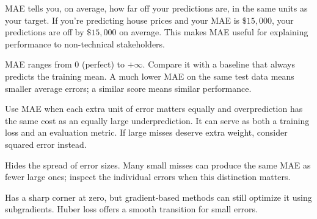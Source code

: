 \clearpage
\thispagestyle{regressionstyle}
\label{sec:mae}

MAE tells you, on average, how far off your predictions are, in the same units as your target. If you're predicting house prices and your MAE is $\$15{,}000$, your predictions are off by $\$15{,}000$ on average. This makes MAE useful for explaining performance to non-technical stakeholders.

\begin{metricformula}
\end{metricformula}

MAE ranges from $0$ (perfect) to $+\infty$. Compare it with a baseline that always predicts the training mean. A much lower MAE on the same test data means smaller average errors; a similar score means similar performance.


Use MAE when each extra unit of error matters equally and overprediction has the same cost as an equally large underprediction. It can serve as both a training loss and an evaluation metric. If large misses deserve extra weight, consider squared error instead.

{
    \item Hides the spread of error sizes. Many small misses can produce the same MAE as fewer large ones; inspect the individual errors when this distinction matters.
    \item Has a sharp corner at zero, but gradient-based methods can still optimize it using subgradients. Huber loss offers a smooth transition for small errors.
}

